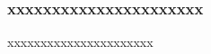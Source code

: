 \documentclass{beamer}
\begin{document}
\subsubsection{xxxxxxxxxxxxxxxxxxxxxx}
\begin{frame}{xxxxxxxxxxxxxxxxxxxxxx}

\end{frame}

\end{document}
